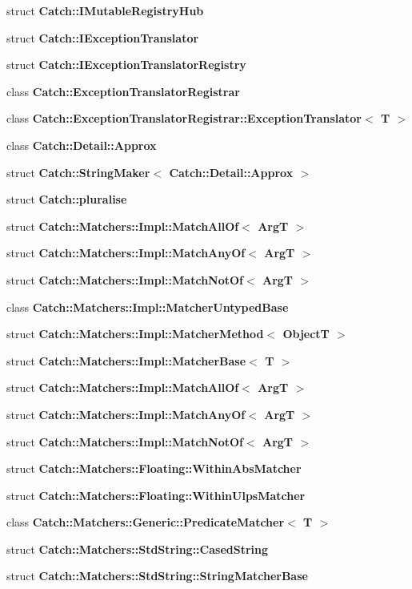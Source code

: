 \begin{DoxyCompactItemize}
\item 
struct \textbf{ Catch\+::\+I\+Mutable\+Registry\+Hub}
\item 
struct \textbf{ Catch\+::\+I\+Exception\+Translator}
\item 
struct \textbf{ Catch\+::\+I\+Exception\+Translator\+Registry}
\item 
class \textbf{ Catch\+::\+Exception\+Translator\+Registrar}
\item 
class \textbf{ Catch\+::\+Exception\+Translator\+Registrar\+::\+Exception\+Translator$<$ T $>$}
\item 
class \textbf{ Catch\+::\+Detail\+::\+Approx}
\item 
struct \textbf{ Catch\+::\+String\+Maker$<$ Catch\+::\+Detail\+::\+Approx $>$}
\item 
struct \textbf{ Catch\+::pluralise}
\item 
struct \textbf{ Catch\+::\+Matchers\+::\+Impl\+::\+Match\+All\+Of$<$ Arg\+T $>$}
\item 
struct \textbf{ Catch\+::\+Matchers\+::\+Impl\+::\+Match\+Any\+Of$<$ Arg\+T $>$}
\item 
struct \textbf{ Catch\+::\+Matchers\+::\+Impl\+::\+Match\+Not\+Of$<$ Arg\+T $>$}
\item 
class \textbf{ Catch\+::\+Matchers\+::\+Impl\+::\+Matcher\+Untyped\+Base}
\item 
struct \textbf{ Catch\+::\+Matchers\+::\+Impl\+::\+Matcher\+Method$<$ Object\+T $>$}
\item 
struct \textbf{ Catch\+::\+Matchers\+::\+Impl\+::\+Matcher\+Base$<$ T $>$}
\item 
struct \textbf{ Catch\+::\+Matchers\+::\+Impl\+::\+Match\+All\+Of$<$ Arg\+T $>$}
\item 
struct \textbf{ Catch\+::\+Matchers\+::\+Impl\+::\+Match\+Any\+Of$<$ Arg\+T $>$}
\item 
struct \textbf{ Catch\+::\+Matchers\+::\+Impl\+::\+Match\+Not\+Of$<$ Arg\+T $>$}
\item 
struct \textbf{ Catch\+::\+Matchers\+::\+Floating\+::\+Within\+Abs\+Matcher}
\item 
struct \textbf{ Catch\+::\+Matchers\+::\+Floating\+::\+Within\+Ulps\+Matcher}
\item 
class \textbf{ Catch\+::\+Matchers\+::\+Generic\+::\+Predicate\+Matcher$<$ T $>$}
\item 
struct \textbf{ Catch\+::\+Matchers\+::\+Std\+String\+::\+Cased\+String}
\item 
struct \textbf{ Catch\+::\+Matchers\+::\+Std\+String\+::\+String\+Matcher\+Base}

\end{DoxyCompactItemize}
